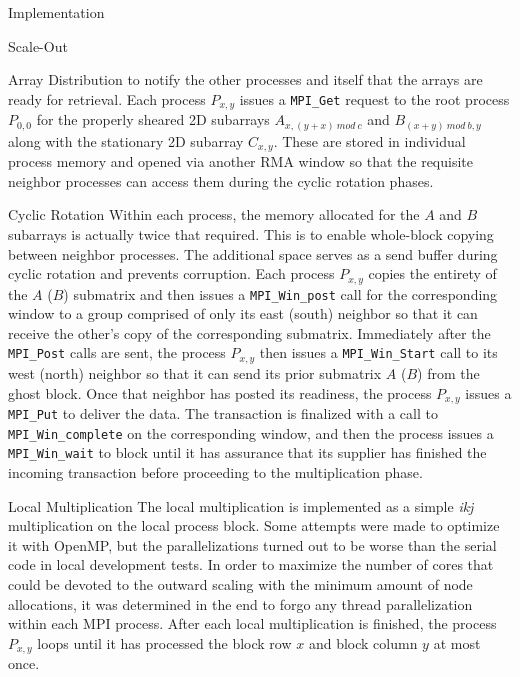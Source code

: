 \documentclass{article}
\begin{document}
\begin{section}{Implementation}
\begin{subsection}{Scale-Out}
\begin{paragraph}{Array Distribution}
      to notify the other processes and itself that the arrays are ready for retrieval. Each process $P_{x,y}$ issues a \texttt{MPI\_Get} request
      to the root process $P_{0,0}$ for the properly sheared 2D subarrays $A_{x,(y+x)\ mod\ c}$ and $B_{(x+y)\ mod\ b, y}$ along with the stationary
      2D subarray $C_{x,y}$. These are stored in individual process memory and opened via another RMA window so that the requisite neighbor processes
      can access them during the cyclic rotation phases.
    \end{paragraph}
    \begin{paragraph}{Cyclic Rotation}
      Within each process, the memory allocated for the $A$ and $B$ subarrays is actually twice that required. This is to enable whole-block copying
      between neighbor processes. The additional space serves as a send buffer during cyclic rotation and prevents corruption. Each process $P_{x,y}$
      copies the entirety of the $A$ ($B$) submatrix and then issues a \texttt{MPI\_Win\_post} call for the corresponding window to a group comprised of
      only its east (south) neighbor so that it can receive the other's copy of the corresponding submatrix. Immediately after the \texttt{MPI\_Post}
      calls are sent, the process $P_{x,y}$ then issues a \texttt{MPI\_Win\_Start} call to its west (north) neighbor so that it can send its prior submatrix
      $A$ ($B$) from the ghost block. Once that neighbor has posted its readiness, the process $P_{x,y}$ issues a \texttt{MPI\_Put} to deliver the data.
      The transaction is finalized with a call to \texttt{MPI\_Win\_complete} on the corresponding window, and then the process issues a \texttt{MPI\_Win\_wait}
      to block until it has assurance that its supplier has finished the incoming transaction before proceeding to the multiplication phase.
    \end{paragraph}
    \begin{paragraph}{Local Multiplication}
      The local multiplication is implemented as a simple \emph{ikj} multiplication on the local process block. Some attempts were made to optimize it
      with OpenMP, but the parallelizations turned out to be worse than the serial code in local development tests. In order to maximize the number
      of cores that could be devoted to the outward scaling with the minimum amount of node allocations, it was determined in the end to forgo any
      thread parallelization within each MPI process. After each local multiplication is finished, the process $P_{x,y}$ loops until it has processed
      the block row $x$ and block column $y$ at most once.

\end{paragraph}
\end{subsection}
\end{section}
\end{document}
